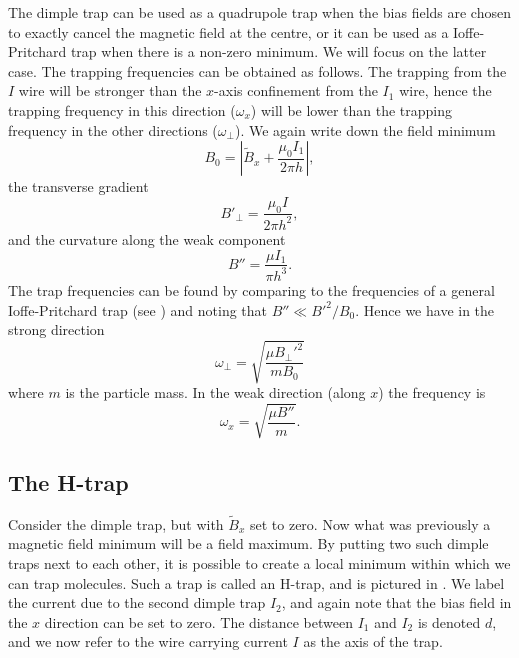 The dimple trap can be used as a quadrupole trap when the bias fields are
chosen to exactly cancel the magnetic field at the centre, or it can be used as
a Ioffe-Pritchard trap when there is a non-zero minimum. We will focus on the
latter case.
%
The trapping frequencies can be obtained as follows. 
%
The trapping from the $I$ wire will be stronger than the $x$-axis
confinement from the $I_1$ wire, hence the trapping frequency in this
direction ($\omega_x$) will be lower than the trapping frequency in the other
directions ($\omega_\perp$). We again write down the field minimum
%
\begin{equation}
  B_0 = \left|\tilde{B}_x + \frac{\mu_0 I_1}{2\pi h}\right|,
\end{equation}
%
the transverse gradient
%
\begin{equation}
  B'_\perp = \frac{\mu_0 I}{2 \pi h^2},
\end{equation}
%
and the curvature along the weak component
%
\begin{equation}
  B'' = \frac{\mu I_1}{\pi h^3}.
\end{equation}
%
The trap frequencies can be found by comparing to the frequencies of a general
Ioffe-Pritchard trap (see ) and noting that $B'' \ll
B'^2/B_0$. Hence we have in the strong direction
%
\begin{equation}
  \omega_\perp = \sqrt{\frac{\mu B_\perp'^2}{m B_0}}
  \label{theory:eqn:perpfreq}
\end{equation}
%
where $m$ is the particle mass. In the weak direction (along $x$) the frequency
is
%
\begin{equation}
  \omega_x = \sqrt{\frac{\mu B''}{m}}.
  \label{theory:eqn:xfreq}
\end{equation}

\subsection{The H-trap}

Consider the dimple trap, but with $\tilde{B}_x$ set to zero. Now what was
previously a magnetic field minimum will be a field maximum. By putting two
such dimple traps next to each other, it is possible to create a local minimum
within which we can trap molecules. Such a trap is called an H-trap, and is
pictured in . We label the current due to the second
dimple trap $I_2$, and again note that the bias field in the $x$ direction can
be set to zero. The distance between $I_1$ and $I_2$ is denoted $d$, and we now
refer to the wire carrying current $I$ as the axis of the trap.

